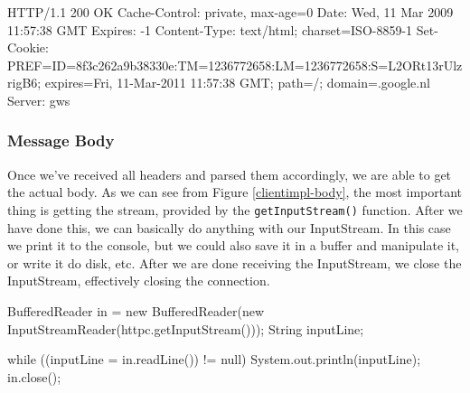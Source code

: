 \begin{figure*}[ht] %
\begin{center}
\begin{code}
HTTP/1.1 200 OK
Cache-Control: private, max-age=0
Date: Wed, 11 Mar 2009 11:57:38 GMT
Expires: -1
Content-Type: text/html; charset=ISO-8859-1
Set-Cookie: 
  PREF=ID=8f3c262a9b38330e:TM=1236772658:LM=1236772658:S=L2ORt13rUlzrigB6; 
  expires=Fri, 11-Mar-2011 11:57:38 GMT; path=/; domain=.google.nl
Server: gws
\end{code}
\caption{An HTTP response including cookies.\label{clientimpl-cookies-resp}}
\end{center}
\end{figure*}

\subsubsection{Message Body}
Once we've received all headers and parsed them accordingly, we are able to get
the actual body. As we can see from Figure \ref{clientimpl-body}, the most
important thing is getting the stream, provided by the \texttt{getInputStream()}
function. After we have done this, we can basically do anything with our
InputStream. In this case we print it to the console, but we could also save it
in a buffer and manipulate it, or write it do disk, etc. After we are done
receiving the InputStream, we close the InputStream, effectively closing the
connection.

\begin{figure*}[ht] %
\begin{center}
\begin{code}
BufferedReader in = 
  new BufferedReader(new InputStreamReader(httpc.getInputStream()));
String inputLine;

while ((inputLine = in.readLine()) != null) {
    System.out.println(inputLine);
}
in.close();
\end{code}
\caption{Retrieving the HTTP response's body.\label{clientimpl-body}}
\end{center}
\end{figure*}

